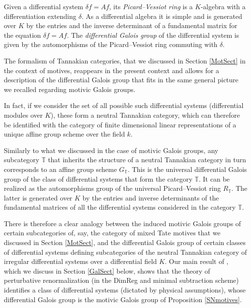 \documentclass[10pt]{amsart}
\def\T{{\mathbb T}}
\numberwithin{equation}{section}
\begin{document}
\smallskip

Given a differential system $\delta f = Af$, its {\em Picard--Vessiot
ring} is a $K$-algebra with a differentiation extending $\delta$. As a
differential algebra it is simple and is generated over $K$ by the
entries and the inverse determinant of a fundamental matrix for the
equation $\delta f = Af$. The {\em differential Galois group} of the
differential system is given by the automorphisms of the
Picard--Vessiot ring commuting with $\delta$.

\smallskip

The formalism of Tannakian categories, that we discussed in Section
\ref{MotSect} in the context of motives, reappears in the present
context and allows for a description of the differential Galois group
that fits in the same general picture we recalled regarding motivic
Galois groups.

\smallskip

In fact, if we consider the set of all possible such differential systems
(differential modules over $K$), these form a neutral
Tannakian category, which can therefore be identified with the
category of finite dimensional linear
representations of a unique affine group scheme over the field $k$.

\smallskip

Similarly to what we discussed in the case of motivic Galois groups,
any subcategory $\T$ that inherits the structure of a neutral
Tannakian category in turn corresponds to an affine group scheme $G_\T$.
This is the universal differential Galois group of the class of
differential systems that form the category $\T$. It can be realized
as the automorphisms group of the universal Picard--Vessiot ring
$R_\T$. The latter is generated over $K$ by the entries and inverse
determinants of the fundamental matrices of all the differential
systems considered in the category $\T$.

\smallskip

There is therefore a clear analogy between the induced motivic Galois
groups of certain subcategories of, say, the category of mixed Tate
motives that we discussed in Section \ref{MotSect}, and the
differential Galois group of certain classes of differential
systems defining subcategories of the neutral Tannakian category of
irregular differential systems over a differential field $K$. Our main
result of \cite{cmln}, which we discuss in Section \ref{GalSect}
below, shows that the theory of perturbative renormalization (in the
DimReg and minimal subtraction scheme)
identifies a class of differential systems (dictated by physical
assumptions), whose differential Galois group is the motivic Galois
group of Proposition \ref{SNmotives}.
\end{document}
